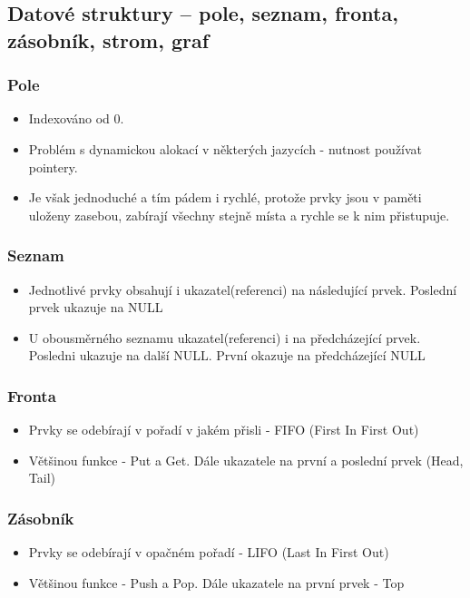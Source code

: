 \documentclass[10pt,a4paper]{article}
\begin{document}
\subsection{Datové struktury – pole, seznam, fronta, zásobník, strom, graf}
\subsubsection{Pole}
\begin{itemize}
\item Indexováno od 0.
\item Problém s dynamickou alokací v některých jazycích - nutnost používat pointery.
\item Je však jednoduché a tím pádem i rychlé, protože prvky jsou v paměti uloženy zasebou, zabírají všechny stejně místa a rychle se k nim přistupuje.
\end{itemize}
\subsubsection{Seznam}
\begin{itemize}
\item Jednotlivé prvky obsahují i ukazatel(referenci) na následující prvek. Poslední prvek ukazuje na NULL
\item U obousměrného seznamu ukazatel(referenci) i na předcházející prvek. Posledni ukazuje na další NULL. První okazuje na předcházející NULL
\end{itemize}
\subsubsection{Fronta}
\begin{itemize}
\item Prvky se odebírají v pořadí v jakém přisli - FIFO (First In First Out)
\item Většinou funkce - Put a Get. Dále ukazatele na první a poslední prvek (Head, Tail)
\end{itemize}
\subsubsection{Zásobník}
\begin{itemize}
\item Prvky se odebírají v opačném pořadí - LIFO (Last In First Out)
\item Většinou funkce - Push a Pop. Dále ukazatele na první prvek - Top
\end{itemize}
\end{document}
